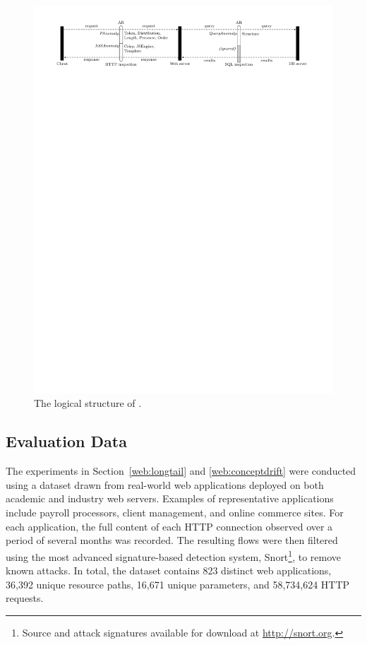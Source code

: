 \begin{figure}[p]
  \begin{center}
    \hspace*{2.5cm}
    \includegraphics[angle=90,scale=.8]{figures/web/masibty/masibty-architecture}
  \end{center}

  \vspace*{-1cm}
  \caption{The logical structure of \masibty.}
  \label{fig:masibty-architecture}
\end{figure}

\subsection{Evaluation Data}
\label{web:intro:eval}
The experiments in Section~\ref{web:longtail} and \ref{web:conceptdrift} were conducted using a dataset drawn from real-world web applications deployed on both academic and industry web servers.  Examples of representative applications include payroll processors, client management, and online commerce sites.  For each application, the full content of each \ac{HTTP} connection observed over a period of several months was recorded.  The resulting flows were then filtered using the most advanced signature-based detection system, \textsf{Snort}\footnote{Source and attack signatures available for download at \url{http://snort.org}.}, to remove known attacks.  In total, the dataset contains 823 distinct web applications, 36,392 unique resource paths, 16,671 unique parameters, and 58,734,624 \ac{HTTP} requests.

